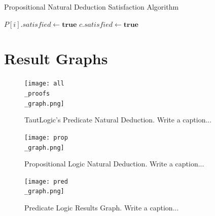 \documentclass[ms]{uncgdissertationexp2}
\theoremstyle{plain}
\theoremstyle{definition}
\theoremstyle{remark}
\newcommand{\titlecaption}[2]{\caption[#1]{#1. #2}}
\begin{document}
\begin{algorithm}
    \caption{Propositional Natural Deduction Satisfaction Algorithm}\label{euclid}
    \begin{algorithmic}[1]
                    \State $P[i].satisfied\gets{\textbf{true}}$
                \EndIf
            \EndFor
                \State $c.satisfied\gets{\textbf{true}}$
            \EndIf
        \EndWhile
      \EndProcedure
    \end{algorithmic}
  \end{algorithm}

\chapter{Result Graphs}

\begin{figure}
    \centering
    \texttt{[image: all\\\_proofs\\\_graph.png]}
    \titlecaption{TautLogic's Predicate Natural Deduction}{Write a caption...}
    \label{fig:allproofsgraph}
\end{figure} 

\begin{figure}[ht]
    \centering
    \texttt{[image: prop\\\_graph.png]}
    \titlecaption{Propositional Logic Natural Deduction}{Write a caption...}
    \label{fig:propgraph}
\end{figure} 

\begin{figure}[ht]
    \centering
    \texttt{[image: pred\\\_graph.png]}
    \titlecaption{Predicate Logic Results Graph}{Write a caption...}
    \label{fig:predgraph}
\end{figure} 

\backmatter
\end{document}
